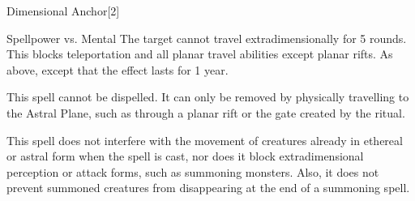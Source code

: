 \begin{spellsection}{Dimensional Anchor}[2]
    \begin{spellheader}
    \end{spellheader}
    \begin{spellcontent}
        \begin{spelltargetinginfo}
        \end{spelltargetinginfo}
        \begin{spelleffects}
            \begin{spellattack}{Spellpower vs. Mental}
                \spellsuccess  The target cannot travel extradimensionally for 5 rounds. This blocks teleportation and all planar travel abilities except planar rifts.
                \spellcritical As above, except that the effect lasts for 1 year.
            \end{spellattack}
        \end{spelleffects}
    \end{spellcontent}
    \begin{spellfooter}
        \spellnotes This spell cannot be dispelled. It can only be removed by physically travelling to the Astral Plane, such as through a planar rift or the gate created by the  ritual.

        This spell does not interfere with the movement of creatures already in ethereal or astral form when the spell is cast, nor does it block extradimensional perception or attack forms, such as summoning monsters. Also, it does not prevent summoned creatures from disappearing at the end of a summoning spell.
        \miscastrandom
    \end{spellfooter}
\end{spellsection}

